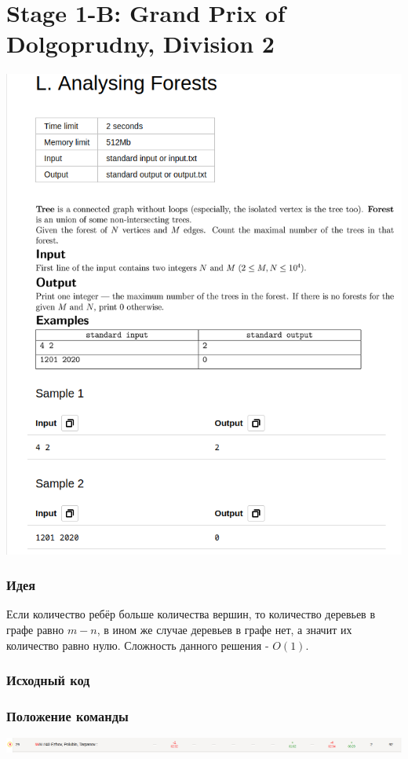 \documentclass[12pt]{article}
\begin{document}
\section{Stage 1-B: Grand Prix of Dolgoprudny, Division 2}
\includegraphics[scale=0.75]{statements/1_L.png}
\subsubsection*{Идея}
Если количество ребёр больше количества вершин, то количество деревьев в графе равно $m-n$,
в ином же случае деревьев в графе нет, а значит их количество равно нулю.
Сложность данного решения - $O(1)$.

\subsubsection*{Исходный код}

\subsubsection*{Положение команды}
\includegraphics[scale=0.5]{images/1.png}\newline\noindent
\end{document}
